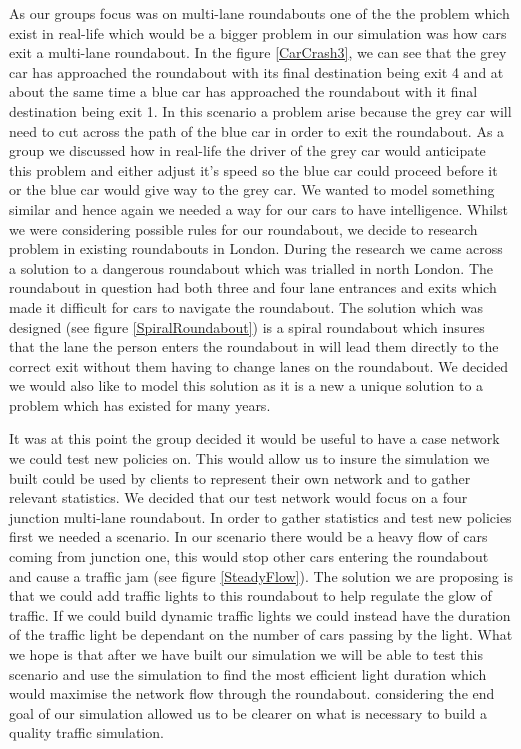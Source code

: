 \documentclass{article}
\begin{document}
	As our groups focus was on multi-lane roundabouts one of the the problem which exist in real-life which would be a bigger problem in our simulation was how cars exit a multi-lane roundabout. In the figure \ref{CarCrash3}, we can see that  the grey car has approached the roundabout with its final destination being exit 4 and at about the same time a blue car has approached the roundabout with it final destination being exit 1. In this scenario a problem arise because the grey car will need to cut across the path of the blue car in order to exit the roundabout. As a group we discussed how in real-life the driver of the grey car would anticipate this problem and either adjust it's speed so the blue car could proceed before it or the blue car would give way to the grey car. We wanted to model something similar and hence again we needed a way for our cars to have intelligence. Whilst we were considering possible rules for our roundabout, we decide to research problem in existing roundabouts in London. During the research we came across a solution to a dangerous roundabout which was trialled in north London. The roundabout in question had both three and four lane entrances and exits which made it difficult for cars to navigate the roundabout. The solution which was designed (see figure \ref{SpiralRoundabout}) is a spiral roundabout which insures that the lane the person enters the roundabout in will lead them directly to the correct exit without them having to change lanes on the roundabout. We decided we would also like to model this solution as it is a new a unique solution to a problem which has existed for many years. 
	
	It was at this point the group decided it would be useful to have a case network we could test new policies on. This would allow us to insure the simulation we built could be used by clients to represent their own network and to gather relevant statistics. We decided that our test network would focus on a four junction multi-lane roundabout. In order to gather statistics and test new policies first we needed a scenario. In our scenario there would be a heavy flow of cars coming from junction one, this would stop other cars entering the roundabout and cause a traffic jam (see figure \ref{SteadyFlow}). The solution we are proposing is that we could add traffic lights to this roundabout to help regulate the glow of traffic. If we could build dynamic traffic lights we could instead have the duration of the traffic light be dependant on the number of cars passing by the light. What we hope is that after we have built our simulation we will be able to test this scenario and use the simulation to find the most efficient light duration which would maximise the network flow through the roundabout. considering the end goal of our simulation allowed us to be clearer on what is necessary to build a quality traffic simulation.  
	
\end{document}

